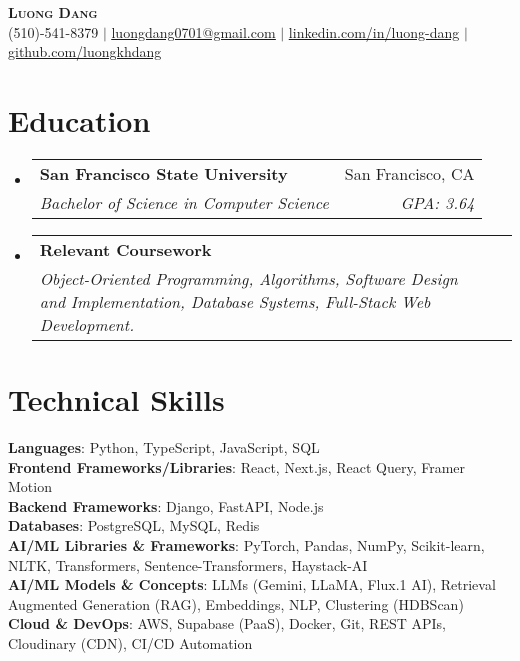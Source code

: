 \documentclass[letterpaper,10pt]{article}
\makeatletter
\newcommand{\resumeSubheading}[4]{
  \vspace{-3pt}\item %
  \begin{tabular*}{0.97\textwidth}[t]{l@{\extracolsep{\fill}}r} %
    \textbf{#1} & #2 \\
    \textit{\small#3} & \textit{\small #4} \\
  \end{tabular*}\vspace{-8pt} %
}
\newcommand{\resumeSubHeadingListStart}{\begin{itemize}[leftmargin=0.15in, label={}]} %
\newcommand{\resumeSubHeadingListEnd}{\end{itemize}} %
\makeatother
\begin{document}
\begin{center}
    \textbf{\Huge \scshape Luong Dang} \\ \vspace{1pt} %
    \small %
    (510)-541-8379 $|$
    \href{mailto:luongdang0701@gmail.com}{\underline{luongdang0701@gmail.com}} $|$
    \href{https://linkedin.com/in/luong-dang}{\underline{linkedin.com/in/luong-dang}} $|$
    \href{https://github.com/luongkhdang}{\underline{github.com/luongkhdang}}
\end{center}

\section{Education}
  \resumeSubHeadingListStart
    \resumeSubheading
      {San Francisco State University}{San Francisco, CA}
      {Bachelor of Science in Computer Science}{GPA: 3.64} %
    \resumeSubheading %
      {Relevant Coursework}{} %
      {Object-Oriented Programming, Algorithms, Software Design and Implementation, Database Systems, Full-Stack Web Development.}{} %
  \resumeSubHeadingListEnd

\section{Technical Skills}
 \begin{itemize}[leftmargin=0.15in, label={}]
    \small{\item{ %
        \textbf{Languages}{: Python, TypeScript, JavaScript, SQL} \\
        \textbf{Frontend Frameworks/Libraries}{: React, Next.js, React Query, Framer Motion} \\
        \textbf{Backend Frameworks}{: Django, FastAPI, Node.js} \\
        \textbf{Databases}{: PostgreSQL, MySQL, Redis} \\
        \textbf{AI/ML Libraries \& Frameworks}{: PyTorch, Pandas, NumPy, Scikit-learn, NLTK, Transformers, Sentence-Transformers, Haystack-AI} \\
        \textbf{AI/ML Models \& Concepts}{: LLMs (Gemini, LLaMA, Flux.1 AI), Retrieval Augmented Generation (RAG), Embeddings, NLP, Clustering (HDBScan)} \\
        \textbf{Cloud \& DevOps}{: AWS, Supabase (PaaS), Docker, Git, REST APIs, Cloudinary (CDN), CI/CD Automation}
    }}
 \end{itemize}
\end{document}
